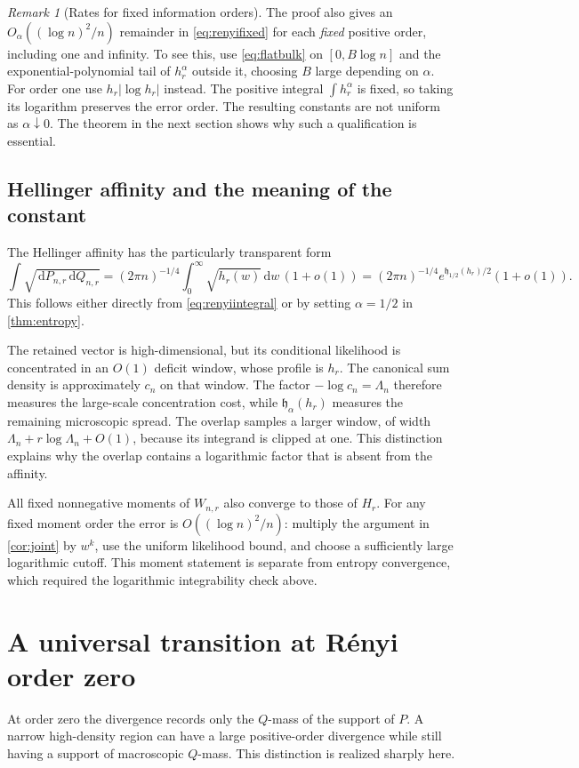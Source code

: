 \documentclass[11pt,oneside]{article}
\numberwithin{equation}{section}
\theoremstyle{plain}
\theoremstyle{definition}
\theoremstyle{remark}
\newtheorem{remark}[theorem]{Remark}
\newcommand{\dd}{\,\mathrm d}
\begin{document}
\begin{remark}[Rates for fixed information orders]
The proof also gives an $O_\alpha((\log n)^2/n)$ remainder in
\eqref{eq:renyifixed} for each \emph{fixed} positive order, including
one and infinity. To see this, use \eqref{eq:flatbulk} on
$[0,B\log n]$ and the exponential-polynomial tail of $h_r^\alpha$
outside it, choosing $B$ large depending on $\alpha$. For order one
use $h_r|\log h_r|$ instead. The positive integral
$\int h_r^\alpha$ is fixed, so taking its logarithm preserves the
error order. The resulting constants are not uniform as
$\alpha\downarrow0$. The theorem in the next section shows why
such a qualification is essential.
\end{remark}

\subsection{Hellinger affinity and the meaning of the constant}
The Hellinger affinity has the particularly transparent form
\begin{equation}\label{eq:affinity}
 \int\sqrt{\dd P_{n,r}\dd Q_{n,r}}
 =(2\pi n)^{-1/4}\int_0^\infty\sqrt{h_r(w)}\dd w\,(1+o(1))
 =(2\pi n)^{-1/4}e^{\mathfrak h_{1/2}(h_r)/2}(1+o(1)).
\end{equation}
This follows either directly from \eqref{eq:renyiintegral} or by
setting $\alpha=1/2$ in \cref{thm:entropy}.

The retained vector is high-dimensional, but its conditional likelihood
is concentrated in an $O(1)$ deficit window, whose profile is $h_r$.
The canonical sum density is approximately $c_n$ on that window.
The factor $-\log c_n=\Lambda_n$ therefore measures the
large-scale concentration cost, while $\mathfrak h_\alpha(h_r)$
measures the remaining microscopic spread. The overlap samples a
larger window, of width $\Lambda_n+r\log\Lambda_n+O(1)$, because its
integrand is clipped at one. This distinction explains why the overlap
contains a logarithmic factor that is absent from the affinity.

All fixed nonnegative moments of $W_{n,r}$ also converge to those of
$H_r$. For any fixed moment order the error is $O((\log n)^2/n)$:
multiply the argument in \cref{cor:joint} by $w^k$, use the uniform
likelihood bound, and choose a sufficiently large logarithmic cutoff.
This moment statement is separate from entropy convergence, which
required the logarithmic integrability check above.

\section{A universal transition at R\'enyi order zero}
\label{sec:crossover}
At order zero the divergence records only the $Q$-mass of the
support of $P$. A narrow high-density region can have a large
positive-order divergence while still having a support of macroscopic
$Q$-mass. This distinction is realized sharply here.
\end{document}
